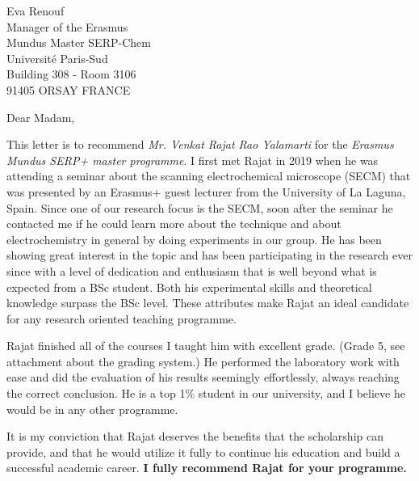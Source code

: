 \documentclass[11pt, a4paper]{letter} %
\begin{document}

\begin{letter}{

Eva Renouf \\
Manager of the Erasmus \\ \hspace{0.1 cm} Mundus Master SERP-Chem \\
Université Paris-Sud \\
Building 308 - Room 3106 \\
91405 ORSAY FRANCE \\
}





\opening{Dear Madam,}

This letter is to recommend \emph{Mr. Venkat Rajat Rao Yalamarti} for the \emph{Erasmus Mundus SERP+ master programme}. I first met Rajat in 2019 when he was attending a seminar about the scanning electrochemical microscope (SECM) that was presented by an Erasmus+ guest lecturer from the University of La Laguna, Spain. Since one of our research focus is the SECM, soon after the seminar he contacted me if he could learn more about the technique and about electrochemistry in general by doing experiments in our group. He has been showing great interest in the topic and has been participating in the research ever since with a level of dedication and enthusiasm that is well beyond what is expected from a BSc student. Both his experimental skills and theoretical knowledge surpass the BSc level. These attributes make Rajat an ideal candidate for any research oriented teaching programme.

Rajat finished all of the courses I taught him with excellent grade. (Grade 5, see attachment about the grading system.) He performed the laboratory work with ease and did the evaluation of his results seemingly effortlessly, always reaching the correct conclusion. He is a top 1\% student in our university, and I believe he would be in any other programme.

It is my conviction that Rajat deserves the benefits that the scholarship can provide, and that he would utilize it fully to continue his education and build a successful academic career. \textbf{I fully recommend Rajat for your programme.}


\end{letter}
\end{document}
